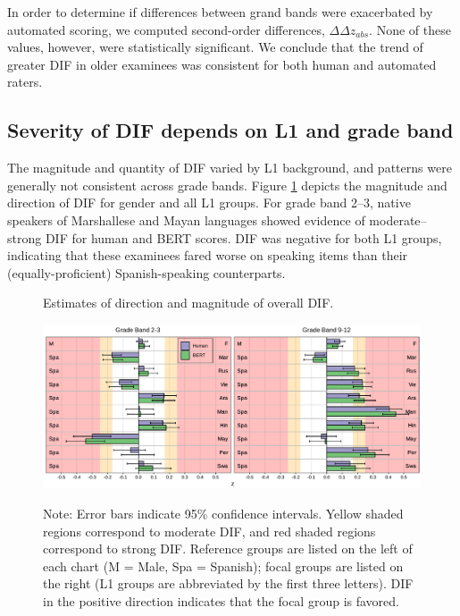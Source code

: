 \documentclass [PhD] {uclathes}
\begin{document}
In order to determine if differences between grand bands were exacerbated by automated scoring, we computed second-order differences, $\Delta \Delta z_{abs}$. None of these values, however, were statistically significant. We conclude that the trend of greater DIF in older examinees was consistent for both human and automated raters. 

\subsection{Severity of DIF depends on L1 and grade band}

The magnitude and quantity of DIF varied by L1 background, and patterns were generally not consistent across grade bands. Figure \ref{fig:z_ovr} depicts the magnitude and direction of DIF for gender and all L1 groups. For grade band 2–3, native speakers of Marshallese and Mayan languages showed evidence of moderate–strong DIF for human and BERT scores. DIF was negative for both L1 groups, indicating that these examinees fared worse on speaking items than their (equally-proficient) Spanish-speaking counterparts. 

\begin{figure}[t]
    \centering
    \caption{Estimates of direction and magnitude of overall DIF.}
\includegraphics[width=6.5in]{figures/20230504_ETS-DIF_BERT_z_ovr_edit.pdf}   
    \label{fig:z_ovr}
\caption*{\small Note: Error bars indicate 95\% confidence intervals. Yellow shaded regions correspond to moderate DIF, and red shaded regions correspond to strong DIF. Reference groups are listed on the left of each chart (M = Male, Spa = Spanish); focal groups are listed on the right (L1 groups are abbreviated by the first three letters). DIF in the positive direction indicates that the focal group is favored.}
\end{figure}
\end{document}

